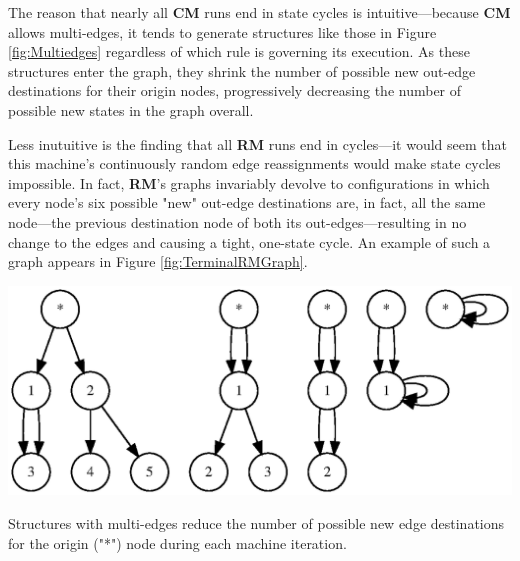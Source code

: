 \documentclass{tufte-handout}
\begin{document}
The reason that nearly all \textbf{CM} runs end in state cycles is
intuitive---because \textbf{CM} allows multi-edges, it tends to generate structures
like those in Figure \ref{fig:Multiedges} regardless of which rule is governing its execution.
As these structures enter the graph, they 
shrink the number of possible new out-edge destinations for their origin nodes,
progressively decreasing the number of possible new states in the graph overall.

Less inutuitive is the finding that all \textbf{RM} runs end in cycles---it would
seem that this machine's continuously random edge reassignments would
make state cycles impossible. In fact, \textbf{RM}'s graphs invariably devolve
to configurations in which every node's six possible "new" out-edge destinations
are, in fact, all the same node---the previous destination node of both its
out-edges---resulting in no change to the edges and causing a tight, one-state cycle.
An example of such a graph appears in Figure \ref{fig:TerminalRMGraph}.


\begin{marginfigure}
\includegraphics{multiedges.ps}
\caption{Structures with multi-edges reduce the number of possible new edge destinations for
the origin ("*") node during each machine iteration.}
\label{fig:Multiedges}
\end{marginfigure}
\end{document}
